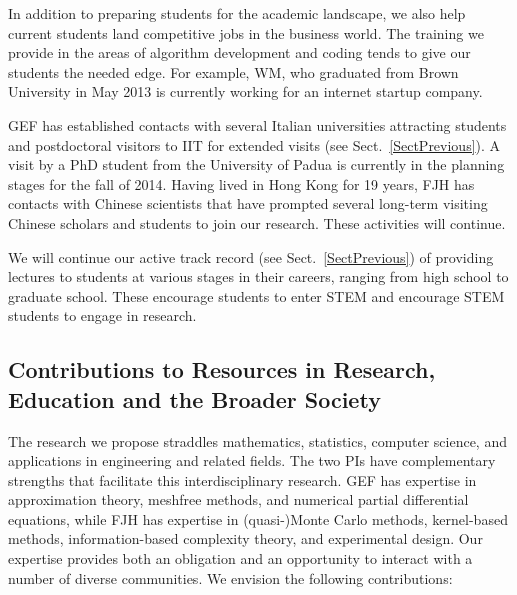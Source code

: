 \documentclass[11pt]{NSFamsart}
\begin{document}
\begin{description}[leftmargin=2.5ex]
\item[Preparing Students for Industry Careers]
In addition to preparing students for the academic landscape, we also help current students land competitive jobs in the business world. The training we provide in the areas of algorithm development and coding tends to give our students the needed edge. For example, WM, who graduated from Brown University in May 2013 is currently working for an internet startup company.

\item[Supervising Visitors]
GEF has established contacts with several Italian universities attracting students and postdoctoral visitors to IIT for extended visits (see Sect.~\ref{SectPrevious}). A visit by a PhD student from the University of Padua is currently in the planning stages for the fall of 2014.  Having lived in Hong Kong for 19 years, FJH has contacts with Chinese scientists that have prompted several long-term visiting Chinese scholars and students to join our research.  These activities will continue.

\item[Giving Short Courses and Invited Lectures]
We will continue our active track record (see Sect.~\ref{SectPrevious}) of providing lectures to students at various stages in their careers, ranging from high school to graduate school. These encourage students to enter STEM and encourage STEM students to engage in research.

\end{description}

\subsection{Contributions to Resources in Research, Education and the Broader Society}

The research we propose straddles mathematics, statistics, computer science, and applications in engineering and related fields.  The two PIs have complementary strengths that facilitate this interdisciplinary research.  GEF has expertise in approximation theory, meshfree methods, and numerical partial differential equations, while FJH has expertise in (quasi-)Monte Carlo methods, kernel-based methods, information-based complexity theory, and experimental design. Our expertise provides both an obligation and an opportunity to interact with a number of diverse communities. We envision the following contributions:
\end{document}

